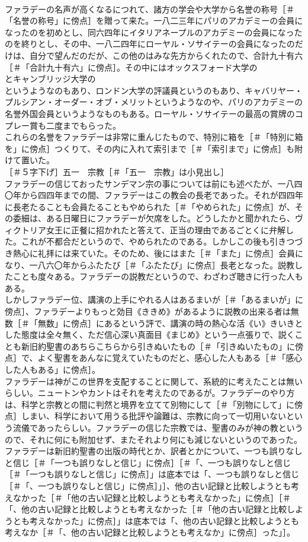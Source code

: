 \documentclass[8pt]{extreport}
\begin{document}
\begin{CJK}{UTF8}{min}
\\	ファラデーの名声が高くなるにつれて、諸方の学会や大学から名誉の称号［＃「名誉の称号」に傍点］を贈って来た。一八二三年にパリのアカデミーの会員になったのを初めとし、同六四年にイタリアネープルのアカデミーの会員になったのを終りとし、その中、一八二四年にローヤル・ソサイテーの会員になったのだけは、自分で望んだのだが、この他のはみな先方からくれたので、合計九十有六［＃「合計九十有六」に傍点］。その中にはオックスフォード大学の 
\\	とキャンブリッジ大学の 
\\	というようなのもあり、ロンドン大学の評議員というのもあり、キャバリヤー・プルシアン・オーダー・オブ・メリットというようなのや、パリのアカデミーの名誉外国会員というようなものもある。ローヤル・ソサイテーの最高の賞牌のコプレー賞も二度までもらった。
\\	これらの名誉をファラデーは非常に重んじたもので、特別に箱を［＃「特別に箱を」に傍点］つくりて、その内に入れて索引まで［＃「索引まで」に傍点］も附けて置いた。
\\	［＃５字下げ］五一　宗教［＃「五一　宗教」は小見出し］
\\	ファラデーの信じておったサンデマン宗の事については前にも述べたが、一八四〇年から四四年までの間、ファラデーはこの教会の長老であった。それが四四年に長老たることも会員たることもやめられた［＃「やめられた」に傍点］が、その委細は、ある日曜日にファラデーが欠席をした。どうしたかと聞かれたら、ヴィクトリア女王に正餐に招かれたと答えて、正当の理由であるごとくに弁解した。これが不都合だというので、やめられたのである。しかしこの後も引きつづき熱心に礼拝には来ていた。そのため、後にはまた［＃「また」に傍点］会員になり、一八六〇年からふたたび［＃「ふたたび」に傍点］長老となった。説教したことも度々ある。ファラデーの説教だというので、わざわざ聴きに行った人もある。
\\	しかしファラデー位、講演の上手にやれる人はあるまいが［＃「あるまいが」に傍点］、ファラデーよりもっと効目《ききめ》があるように説教の出来る者は無数［＃「無数」に傍点］にあるという評で、講演の時の熱心な活《い》きいきとした態度は全々無く、ただ信心深い真面目《まじめ》という一点張りで、説くことも新旧約聖書のあちらこちらから引きぬいたもの［＃「引きぬいたもの」に傍点］で、よく聖書をあんなに覚えていたものだと、感心した人もある［＃「感心した人もある」に傍点］。
\\	ファラデーは神がこの世界を支配することに関して、系統的に考えたことは無いらしい。ニュートンやカントはそれを考えたのであるが。ファラデーのやり方は、科学と宗教との間に判然と境界を立てて別物にして［＃「別物にして」に傍点］しまい、科学において用うる批評や論難は、宗教に向って一切用いないという流儀であったらしい。ファラデーの信じた宗教では、聖書のみが神の教というので、それに何にも附加せず、またそれより何にも減じないというのであった。ファラデーは新旧約聖書の出版の時代とか、訳者とかについて、一つも誤りなしと信じ［＃「一つも誤りなしと信じ」に傍点］［＃「、一つも誤りなしと信じ［＃「一つも誤りなしと信じ」に傍点］」は底本では「、一つも誤りなしと信じ［＃「、一つも誤りなしと信じ」に傍点］」］、他の古い記録と比較しようとも考えなかった［＃「他の古い記録と比較しようとも考えなかった」に傍点］［＃「、他の古い記録と比較しようとも考えなかった［＃「他の古い記録と比較しようとも考えなかった」に傍点］」は底本では「、他の古い記録と比較しようとも考えなか［＃「、他の古い記録と比較しようとも考えなか」に傍点］った」］。

\end{CJK}
\end{document}
